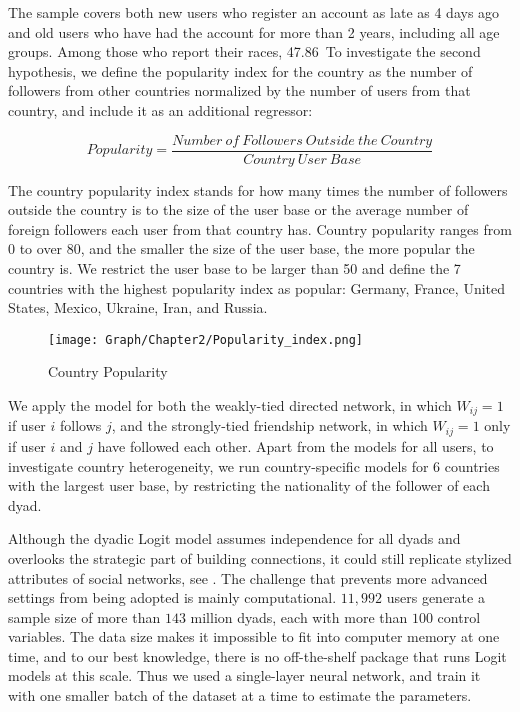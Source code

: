 The sample covers both new users who register an account as late as 4 days ago and old users who have had the account for more than 2 years, including all age groups. Among those who report their races, 47.86\
To investigate the second hypothesis, we define the popularity index for the country as the number of followers from other countries normalized by the number of users from that country, and include it as an additional regressor:

\begin{equation}
  \nonumber
  Popularity = \frac{Number\ of\ Followers\ Outside\ the\ Country}{Country\ User\ Base}
\end{equation}

The country popularity index stands for how many times the number of followers outside the country is to the size of the user base or the average number of foreign followers each user from that country has. Country popularity ranges from 0 to over 80, and the smaller the size of the user base, the more popular the country is. We restrict the user base to be larger than 50 and define the 7 countries with the highest popularity index as popular: Germany, France, United States, Mexico, Ukraine, Iran, and Russia.

\begin{figure} \centering
  \texttt{[image: Graph/Chapter2/Popularity\_index.png]}
    \caption{Country Popularity}
\end{figure}

We apply the model for both the weakly-tied directed network, in which $W_{ij}=1$ if user $i$ follows $j$, and the strongly-tied friendship network, in which $W_{ij}=1$ only if user $i$ and $j$ have followed each other. Apart from the models for all users, to investigate country heterogeneity, we run country-specific models for $6$ countries with the largest user base, by restricting the nationality of the follower of each dyad.

Although the dyadic Logit model assumes independence for all dyads and overlooks the strategic part of building connections, it could still replicate stylized attributes of social networks, see \cite{jochmans2018semiparametric}. The challenge that prevents more advanced settings from being adopted is mainly computational. $11,992$ users generate a sample size of more than $143$ million dyads, each with more than $100$ control variables. The data size makes it impossible to fit into computer memory at one time, and to our best knowledge, there is no off-the-shelf package that runs Logit models at this scale. Thus we used a single-layer neural network, and train it with one smaller batch of the dataset at a time to estimate the parameters.

